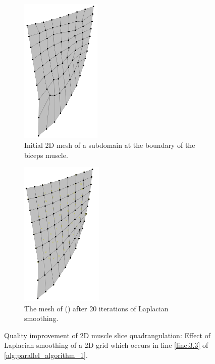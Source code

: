 \begin{figure}%
  \centering%
  \begin{subfigure}[t]{0.48\textwidth}%
    \centering%
    \includegraphics[height=7cm]{images/parallel_fiber_estimation/world_mesh.png}
    \caption{Initial 2D mesh of a subdomain at the boundary of the biceps muscle.}%
    \label{fig:world_mesh}%
  \end{subfigure}
  \quad
  \begin{subfigure}[t]{0.48\textwidth}%
    \centering%
    \includegraphics[height=7cm]{images/parallel_fiber_estimation/world_mesh_improved.png}
    \caption{The mesh of () after 20 iterations of Laplacian smoothing.}%
    \label{fig:world_mesh_improved}%
  \end{subfigure}    
  \caption{Quality improvement of 2D muscle slice quadrangulation: Effect of Laplacian smoothing of a 2D grid which occurs in line \ref{line:3.3} of \cref{alg:parallel_algorithm_1}.}%
  \label{fig:laplace_smoothing}%
\end{figure}%

